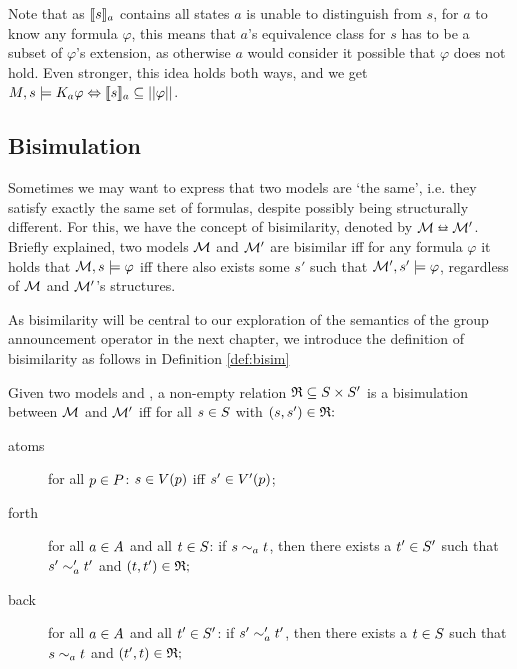  Note that as $\llbracket s\rrbracket_a$ contains all states $a$ is unable to distinguish from $s$, for $a$ to know any formula $\varphi$, this means that $a$'s equivalence class for $s$ has to be a subset of $\varphi$'s extension, as otherwise $a$ would consider it possible that $\varphi$ does not hold. Even stronger, this idea holds both ways, and we get $M,s\models K_a\varphi \Leftrightarrow \llbracket s\rrbracket_a \subseteq ||\varphi||$.

\subsection{Bisimulation}

Sometimes we may want to express that two models are `the same', i.e. they satisfy exactly the same set of formulas, despite possibly being structurally different. For this, we have the concept of bisimilarity, denoted by $\mathcal{M} \leftrightarroweq \mathcal{M}'$. Briefly explained, two models $\mathcal{M}$ and $\mathcal{M}'$ are bisimilar iff for any formula $\varphi$ it holds that $\mathcal{M},s\models\varphi$ iff there also exists some $s'$ such that $\mathcal{M}',s'\models\varphi$, regardless of $\mathcal{M}$ and $\mathcal{M}'$'s structures. 

As bisimilarity will be central to our exploration of the semantics of the group announcement operator in the next chapter, we introduce the definition of bisimilarity as follows in Definition \ref{def:bisim}

\begin{definition}[Bisimulation]\label{def:bisim}
	Given two models \model{} and , a non-empty relation $\mathfrak{R}\subseteq S \times S '$  is a bisimulation between $\mathcal{M}$ and $\mathcal{M}'$ iff for all $s \in S$ with $(s,s') \in \mathfrak{R}\mathfrak{:}$
	\begin{description}
		\item[atoms] for all $p \in P$: $s\in V(p)$ iff $s'\in V '(p)$;
		\item[forth]  for all $a \in A$ and all $t \in S$: if $s\sim_a t$, then there exists a $t'\in S '$ such that $s'\sim'_a t'$ and $(t,t')\in\mathfrak{R}\mathfrak{;}$
		\item[back] for all $a \in A$ and all $t' \in S'$: if $s'\sim'_a t'$, then there exists a $t\in S $ such that $s\sim_a t$ and $(t',t)\in\mathfrak{R}\mathfrak{;}$
	\end{description}
\end{definition} 

